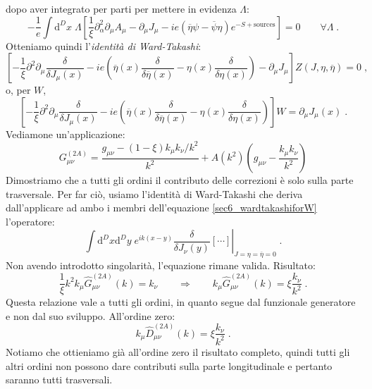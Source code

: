 \documentclass[12pt,a4paper]{article}
\theoremstyle{definition}
\numberwithin{equation}{section}
\newcommand{\diff}[1][]{\mathrm{d}#1}
\begin{document}
dopo aver integrato per parti per mettere in evidenza $\Lambda$:
\begin{equation}
-\frac{1}{e}\int\diff^D{x}\;\Lambda\left[\frac{1}{\xi}\partial^2_{\alpha}\partial_{\mu}A_{\mu}-\partial_{\mu}J_{\mu}-ie(\overline{\eta}\psi-\overline{\psi}\eta)e^{-S+\mbox{sources}}\right]=0\qquad \forall\Lambda\;.
\end{equation}
Otteniamo quindi l'\emph{identità di Ward-Takashi}:
\begin{equation}
\boxed{
\left[-\frac{1}{\xi}\partial^2\partial_{\mu}\frac{\delta}{\delta J_{\mu}(x)}-ie\left(\overline{\eta}(x)\frac{\delta}{\delta\overline{\eta}(x)}-\eta(x)\frac{\delta}{\delta\eta(x)}\right)-\partial_{\mu}J_{\mu}\right]Z(J,\eta,\overline{\eta})=0
}\;,
\end{equation}
o, per $W$,
\begin{equation}
\boxed{
\left[-\frac{1}{\xi}\partial^2\partial_{\mu}\frac{\delta}{\delta J_{\mu}(x)}-ie\left(\overline{\eta}(x)\frac{\delta}{\delta\overline{\eta}(x)}-\eta(x)\frac{\delta}{\delta\eta(x)}\right)\right]W=\partial_{\mu}J_{\mu}(x)
}\;. \label{sec6_wardtakashiforW}
\end{equation}
Vediamone un'applicazione:
$$
G_{\mu\nu}^{(2A)}=\frac{g_{\mu\nu}-(1-\xi)k_{\mu}k_{\nu}/k^2}{k^2}+A(k^2)\left(g_{\mu\nu}-\frac{k_{\mu}k_{\nu}}{k^2}\right)
$$
Dimostriamo che a tutti gli ordini il contributo delle correzioni è solo sulla parte trasversale. Per far ciò, usiamo l'identità di Ward-Takashi che deriva dall'applicare ad ambo i membri dell'equazione \eqref{sec6_wardtakashiforW} l'operatore:
\begin{equation}
\int\diff^D{x}\diff^D{y}\;e^{ik(x-y)}\left.\frac{\delta}{\delta J_{\nu}(y)}\left[\cdots\right]\right|_{J=\eta=\overline{\eta}=0}\;.
\end{equation}
Non avendo introdotto singolarità, l'equazione rimane valida. Risultato:
\begin{equation}
\frac{1}{\xi}k^2k_{\mu}\hat{G}^{(2A)}_{\mu\nu}(k)=k_{\nu}\qquad\Longrightarrow\qquad k_{\mu}\hat{G}^{(2A)}_{\mu\nu}(k)=\xi\frac{k_{\nu}}{k^2}\;.
\end{equation}
Questa relazione vale a tutti gli ordini, in quanto segue dal funzionale generatore e non dal suo sviluppo. All'ordine zero:
\begin{equation}
k_{\mu}\hat{D}_{\mu\nu}^{(2A)}(k)=\xi\frac{k_{\nu}}{k^2}\;.
\end{equation}
Notiamo che ottieniamo già all'ordine zero il risultato completo, quindi tutti gli altri ordini non possono dare contributi sulla parte longitudinale e pertanto saranno tutti trasversali. \\
\end{document}
